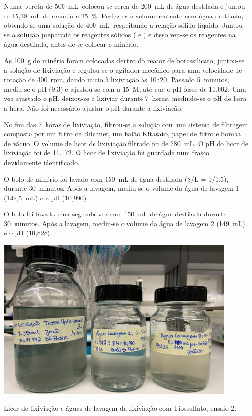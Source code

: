 Numa bureta de 500~mL, colocou-se cerca de 200~mL de água destilada e juntou-se 15,38~mL de amónia a 25~\%.
Perfez-se o volume restante com água destilada, obtendo-se uma solução de 400~mL, respeitando a relação sólido-líquido.
Juntou-se à solução preparada os reagentes sólidos (\tsp{} e \sulfcu{}) e dissolveu-se os reagentes na água destilada, antes de se colocar o minério.

As 100~g de minério foram colocadas dentro do reator de borossilicato, juntou-se a solução de lixiviação e regulou-se o agitador mecânico para uma velocidade de rotação de 400~rpm, dando inicio à lixiviação às 10h20.
Passado 5~minutos, mediu-se o pH (9,3) e ajustou-se com \hidso{} a 15~M, até que o pH fosse de 11,002.
Uma vez ajustado o pH, deixou-se a lixiviar durante 7~horas, medindo-se o pH de hora a hora.
Não foi necessário ajustar o pH durante a lixiviação.

No fim das 7~horas de lixiviação, filtrou-se a solução com um sistema de filtragem composto por um filtro de Büchner, um balão Kitasato, papel de filtro e bomba de vácuo.
O volume de licor de lixiviação filtrado foi de 380~mL.
O pH do licor de lixiviação foi de 11.172.
O licor de lixiviação foi guardado num frasco devidamente identificado.

O bolo de minério foi lavado com 150~mL de água destilada (S/L = 1/1,5), durante 30~minutos.
Após a lavagem, mediu-se o volume da água de lavagem 1 (142,5~mL) e o pH (10,990).

O bolo foi lavado uma segunda vez com 150~mL de água destilada durante 30~minutos.
Após a lavagem, mediu-se o volume da água de lavagem 2 (149~mL) e o pH (10,828).

\begin{marginfigure}
    \centering
    \includegraphics[width=0.9\textwidth]{figures/Licores de lixiviação - tiossulfato 2}
    \caption{Licor de lixiviação e águas de lavagem da lixiviação com Tiossulfato, ensaio 2.}
    \label{fig:licores-lix-tiossulfato2}
\end{marginfigure}

